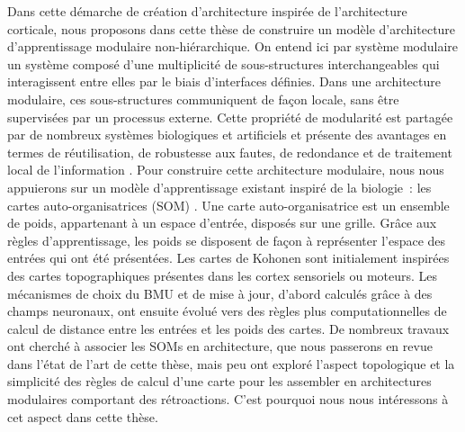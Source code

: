 Dans cette démarche de création d'architecture inspirée de l'architecture corticale, nous proposons dans cette thèse de construire un modèle d'architecture d'apprentissage modulaire non-hiérarchique.
On entend ici par système modulaire un système composé d'une multiplicité de sous-structures interchangeables qui interagissent entre elles par le biais d'interfaces définies. 
Dans une architecture modulaire, ces sous-structures communiquent de façon locale, sans être supervisées par un processus externe. Cette propriété de modularité est partagée par de nombreux systèmes biologiques et artificiels et présente des avantages en termes de réutilisation, de robustesse aux fautes, de redondance et de traitement local de l'information \cite{clune_evolutionary_2013}.
Pour construire cette architecture modulaire, nous nous appuierons sur un modèle d'apprentissage existant inspiré de la biologie~: les cartes auto-organisatrices (SOM) \cite{Kohonen1982}.
Une carte auto-organisatrice est un ensemble de poids, appartenant à un espace d'entrée, disposés sur une grille. Grâce aux règles d'apprentissage, les poids se disposent de façon à représenter l'espace des entrées qui ont été présentées.
Les cartes de Kohonen sont initialement inspirées des cartes topographiques présentes dans les cortex sensoriels ou moteurs. Les mécanismes de choix du BMU et de mise à jour, d'abord calculés grâce à des champs neuronaux, ont ensuite évolué vers des règles plus computationnelles de calcul de distance entre les entrées et les poids des cartes.
De nombreux travaux ont cherché à associer les SOMs en architecture, que nous passerons en revue dans l'état de l'art de cette thèse, mais peu ont exploré l'aspect topologique et la simplicité des règles de calcul d'une carte pour les assembler en architectures modulaires comportant des rétroactions. C'est pourquoi nous nous intéressons à cet aspect dans cette thèse.

